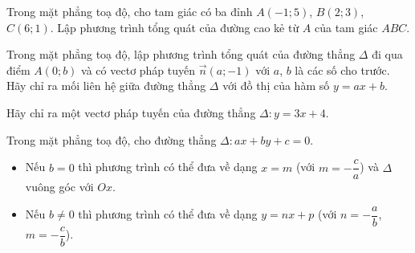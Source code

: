 \begin{vd}
	Trong mặt phẳng toạ độ, cho tam giác có ba đỉnh $A(-1;5)$, $B(2;3)$, $C(6;1)$. Lập phương trình tổng quát của đường cao kẻ từ $A$ của tam giác $ABC$.
\end{vd}

\begin{vd}
	Trong mặt phẳng toạ độ, lập phương trình tổng quát của đường thẳng $\Delta$ đi qua điểm $A(0;b)$ và có vectơ pháp tuyến  $\vec{n}(a;-1)$ với $a$, $b$ là các số cho trước. Hãy chỉ ra mối liên hệ giữa đường thẳng $\Delta$ với đồ thị của hàm số $y=ax+b$.
\end{vd}

\begin{vd}
	Hãy chỉ ra một vectơ pháp tuyến của đường thẳng $\Delta \colon y=3x+4$.
\end{vd}
\begin{nx}
	Trong mặt phẳng toạ độ, cho đường thẳng $ \Delta \colon ax+by+c=0$.
	\begin{itemize}
		\item Nếu $b=0$ thì phương trình có thể đưa về dạng $x=m$ (với $m=-\dfrac{c}{a}$) và $\Delta$ vuông góc với $Ox$.
		\item Nếu $b \ne 0$ thì phương trình có thể đưa về dạng $y=nx+p$ (với $n=-\dfrac{a}{b}$, $m=-\dfrac{c}{b}$).
	\end{itemize}
\end{nx}


